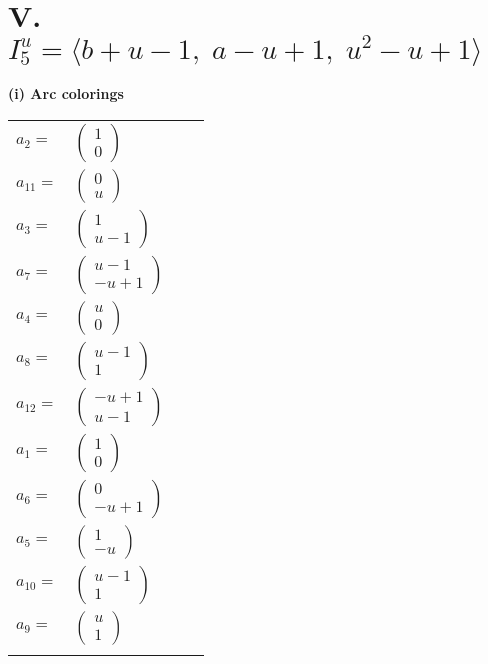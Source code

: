 \documentclass[1p]{elsarticle_modified}
\theoremstyle{definition}
\begin{document}
\centering \section*{V. $I^u_{5}= \langle b+u-1,\;a- u+1,\;u^2- u+1 \rangle$}
\flushleft \textbf{(i) Arc colorings}\\
\begin{tabular}{m{7pt} m{180pt} m{7pt} m{180pt} }
\flushright $a_{2}=$&$\begin{pmatrix}1\\0\end{pmatrix}$ \\
\flushright $a_{11}=$&$\begin{pmatrix}0\\u\end{pmatrix}$ \\
\flushright $a_{3}=$&$\begin{pmatrix}1\\u-1\end{pmatrix}$ \\
\flushright $a_{7}=$&$\begin{pmatrix}u-1\\- u+1\end{pmatrix}$ \\
\flushright $a_{4}=$&$\begin{pmatrix}u\\0\end{pmatrix}$ \\
\flushright $a_{8}=$&$\begin{pmatrix}u-1\\1\end{pmatrix}$ \\
\flushright $a_{12}=$&$\begin{pmatrix}- u+1\\u-1\end{pmatrix}$ \\
\flushright $a_{1}=$&$\begin{pmatrix}1\\0\end{pmatrix}$ \\
\flushright $a_{6}=$&$\begin{pmatrix}0\\- u+1\end{pmatrix}$ \\
\flushright $a_{5}=$&$\begin{pmatrix}1\\- u\end{pmatrix}$ \\
\flushright $a_{10}=$&$\begin{pmatrix}u-1\\1\end{pmatrix}$ \\
\flushright $a_{9}=$&$\begin{pmatrix}u\\1\end{pmatrix}$\\&\end{tabular}
\end{document}
